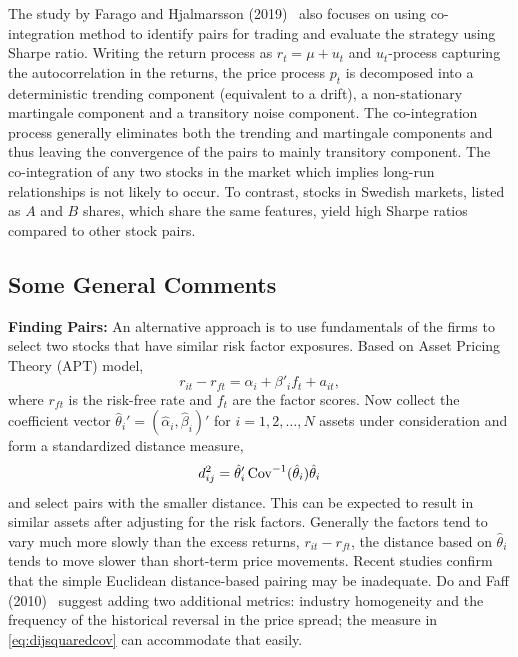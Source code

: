 The study by Farago and Hjalmarsson (2019)~\cite{hjal} also focuses on using co-integration method to identify pairs for trading and evaluate the strategy using Sharpe ratio. Writing the return process as $r_t= \mu + u_t$ and $u_t$-process capturing the autocorrelation in the returns, the price process $p_t$ is decomposed into a deterministic trending component (equivalent to a drift), a non-stationary martingale component and a transitory noise component. The co-integration process generally eliminates both the trending and martingale components and thus leaving the convergence of the pairs to mainly transitory component. The co-integration of any two stocks in the market which implies long-run relationships is not likely to occur. To contrast, stocks in Swedish markets, listed as $A$ and $B$ shares, which share the same features, yield high Sharpe ratios compared to other stock pairs. 


\subsection{Some General Comments}

\noindent\textbf{Finding Pairs:} An alternative approach is to use fundamentals of the firms to select two stocks that have similar risk factor exposures. Based on Asset Pricing Theory (APT) model,
	\begin{equation}
	r_{it} - r_{ft} = \alpha_i + \beta'_if_t + a_{it},
	\end{equation}
where $r_{ft}$ is the risk-free rate and $f_t$ are the factor scores. Now collect the coefficient vector $\hat{\theta}_i' = (\hat{\alpha}_i, \hat{\beta}_i)'$ for $i = 1, 2, \ldots, N$ assets under consideration and form a standardized distance measure,
	\begin{equation} \label{eq:dijsquaredcov}
	d_{ij}^2 = \hat{\theta}_i' \cov^{-1}(\hat{\theta}_i)\hat{\theta}_i
	\end{equation}
and select pairs with the smaller distance. This can be expected to result in similar assets after adjusting for the risk factors. Generally the factors tend to vary much more slowly than the excess returns, $r_{it} - r_{ft}$, the distance based on $\hat{\theta}_i$ tends to move slower than short-term price movements. Recent studies confirm that the simple Euclidean distance-based pairing may be inadequate. Do and Faff (2010)~\cite{do2010does} suggest adding two additional metrics: industry homogeneity and the frequency of the historical reversal in the price spread; the measure in \eqref{eq:dijsquaredcov} can accommodate that easily. \twomedskip


